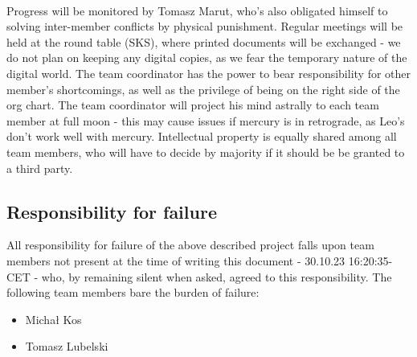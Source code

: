 \\
Progress will be monitored by Tomasz Marut, who's also obligated himself to solving inter-member conflicts by physical punishment. Regular meetings will be held at the round table (SKS), where printed documents will be exchanged - we do not plan on keeping any digital copies, as we fear the temporary nature of the digital world. The team coordinator has the power to bear responsibility for other member's shortcomings, as well as the privilege of being on the right side of the org chart. The team coordinator will project his mind astrally to each team member at full moon - this may cause issues if mercury is in retrograde, as Leo's don't work well with mercury. Intellectual property is equally shared among all team members, who will have to decide by majority if it should be be granted to a third party.

\subsection{Responsibility for failure}
All responsibility for failure of the above described project
falls upon team members not present at the time of writing this document
- 30.10.23	16:20:35-CET - 
who, by remaining silent when asked, agreed to this responsibility.
The following team members bare the burden of failure:
\begin{itemize}
    \item Michał Kos
    \item Tomasz Lubelski
\end{itemize}



